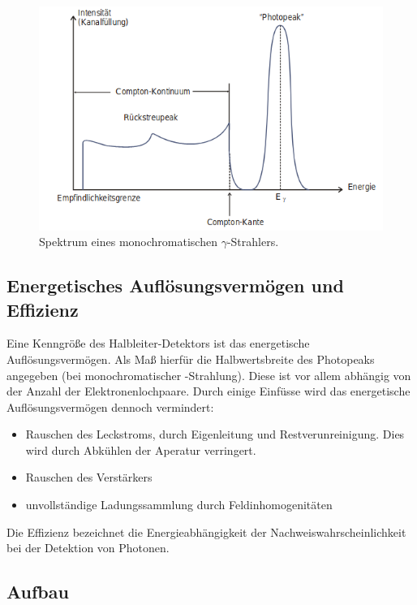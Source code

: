 \begin{figure}
  \centering
  \includegraphics[scale=0.5]{Spektrum.png}
  \caption{Spektrum eines monochromatischen $\gamma$-Strahlers. \cite{Q1}}
  \label{abb:4}
\end{figure}

\subsection{Energetisches Auflösungsvermögen und Effizienz}
Eine Kenngröße des Halbleiter-Detektors ist das energetische Auflösungsvermögen.
Als Maß hierfür die Halbwertsbreite des Photopeaks angegeben (bei
monochromatischer \gamma-Strahlung). Diese ist vor allem abhängig von der
Anzahl der Elektronenlochpaare.
Durch einige Einfüsse wird das energetische Auflösungsvermögen dennoch vermindert:
\begin{itemize}
  \item Rauschen des Leckstroms, durch Eigenleitung und Restverunreinigung.
  Dies wird durch Abkühlen der Aperatur verringert.
  \item Rauschen des Verstärkers
  \item unvollständige Ladungssammlung durch Feldinhomogenitäten
\end{itemize}
Die Effizienz bezeichnet die Energieabhängigkeit der Nachweiswahrscheinlichkeit
bei der Detektion von Photonen.

\subsection{Aufbau}

